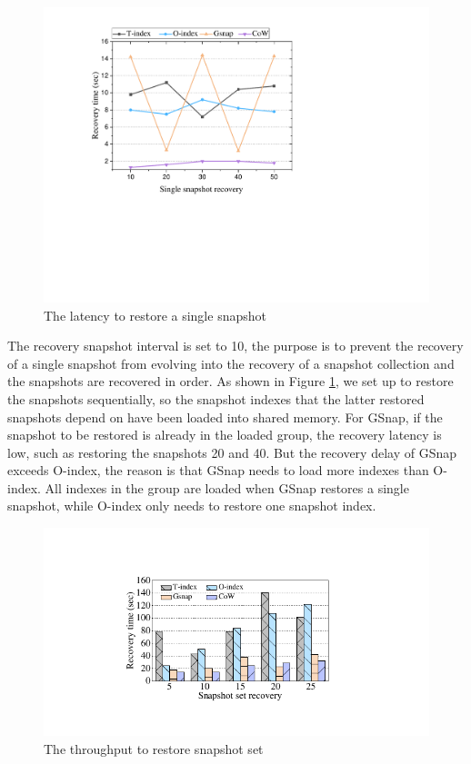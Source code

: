 \documentclass[sigconf, nonacm]{acmart}
\begin{document}
\begin{figure}[htbp]
	\centering
	\includegraphics[width=0.8\columnwidth]{figures/ceph_pic/eval_point.pdf}
	\caption{The latency to restore a single snapshot}
	\label{fig:snapshotpoint}
\end{figure}
The recovery snapshot interval is set to 10, the purpose is to prevent the recovery of a single snapshot from evolving into the recovery of a snapshot collection and the snapshots are recovered in order. As shown in Figure \ref{fig:snapshotpoint}, we set up to restore the snapshots sequentially, so the snapshot indexes that the latter restored snapshots depend on have been loaded into shared memory.  
For GSnap, if the snapshot to be restored is already in the loaded group, the recovery latency is low, such as restoring the snapshots 20 and 40.
But the recovery delay of GSnap exceeds O-index, the reason is that GSnap needs to load more indexes than O-index.
All indexes in the group are loaded when GSnap restores a single snapshot, while O-index only needs to restore one snapshot index.

\begin{figure}[htbp]
	\centering
	\includegraphics[width=0.8\columnwidth]{figures/ceph_pic/eval_sequence.pdf}
	\caption{The throughput to restore snapshot set}
	\label{fig:snapshotlength}
\end{figure}
\end{document}
